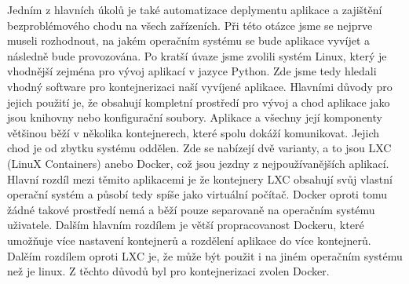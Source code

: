 Jedním z hlavních úkolů je také automatizace deplymentu aplikace a
zajištění bezproblémového chodu na všech zařízeních. Při této otázce
jsme se nejprve museli rozhodnout, na jakém operačním systému se bude
aplikace vyvíjet a následně bude provozována. Po kratší úvaze jsme
zvolili systém Linux, který je vhodnější zejména pro vývoj aplikací v
jazyce Python. Zde jsme tedy hledali vhodný software pro
kontejnerizaci naší vyvíjené aplikace. Hlavními důvody pro jejich
použití je, že obsahují kompletní prostředí pro vývoj a chod aplikace
jako jsou knihovny nebo konfigurační soubory. Aplikace a všechny její
komponenty většinou běží v několika kontejnerech, které spolu dokáží
komunikovat. Jejich chod je od zbytku systému oddělen. Zde se nabízejí
dvě varianty, a to jsou LXC (LinuX Containers) anebo Docker, což jsou
jezdny z nejpoužívanějších aplikací. Hlavní rozdíl mezi těmito
aplikacemi je že kontejnery LXC obsahují svůj vlastní operační systém
a působí tedy spíše jako virtuální počítač. Docker oproti tomu žádné
takové prostředí nemá a běží pouze separovaně na operačním systému
uživatele. Dalším hlavním rozdílem je větší propracovanost Dockeru,
které umožňuje více nastavení kontejnerů a rozdělení aplikace do více
kontejnerů. Dalěím rozdílem oproti LXC je, že může být použit i na
jiném operačním systému než je linux. Z těchto důvodů byl pro
kontejnerizaci zvolen Docker.

\textbf{}
\textit{}



















